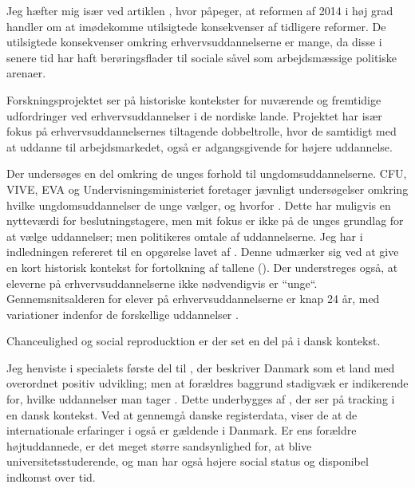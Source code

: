 Jeg hæfter mig især ved artiklen , hvor \citeauthor{jorgensenReformenAfErhvervsuddannelserne2016} påpeger, at reformen af 2014 i høj grad handler om at imødekomme utilsigtede konsekvenser af tidligere reformer.
De utilsigtede konsekvenser omkring erhvervsuddannelserne er mange, da disse i senere tid har haft berøringsflader til sociale såvel som arbejdsmæssige politiske arenaer.

Forskningsprojektet  ser på historiske kontekster for nuværende og fremtidige udfordringer ved erhvervsuddannelser i de nordiske lande.
Projektet har især fokus på erhvervsuddannelsernes tiltagende dobbeltrolle, hvor de samtidigt med at uddanne til arbejdsmarkedet, også er adgangsgivende for højere uddannelse.

Der undersøges en del omkring de unges forhold til ungdomsuddannelserne.
CFU, VIVE, EVA og Undervisningsministeriet foretager jævnligt undersøgelser omkring hvilke ungdomsuddannelser de unge vælger, og hvorfor \autocite[se fx.][]{undervisningsministerietOg10Klasseelevernes2017, borne-ogundervisningsministerietHvemOgHvor, danmarksstatistikErhvervsuddannelserDanmark20192019}.
Dette har muligvis en nytteværdi for beslutningstagere, men mit fokus er ikke på de unges grundlag for at vælge uddannelser; men politikeres omtale af uddannelserne.
Jeg har i indledningen refereret til en opgørelse lavet af \citeauthor{danmarksstatistikErhvervsuddannelserDanmark20192019}.
Denne udmærker sig ved at give en kort historisk kontekst for fortolkning af tallene (\citeyear[s. 8ff]{danmarksstatistikErhvervsuddannelserDanmark20192019}).
Der understreges også, at eleverne på erhvervsuddannelserne ikke nødvendigvis er “unge“.
Gennemsnitsalderen for elever på erhvervsuddannelserne er knap 24 år, med variationer indenfor de forskellige uddannelser \autocite[s. 14]{danmarksstatistikErhvervsuddannelserDanmark20192019}.

Chanceulighed og social reproducktion er der set en del på i dansk kontekst.

Jeg henviste i specialets første del til \citeauthor{munkSocialUlighedOg2014}, der beskriver Danmark som et land med overordnet positiv udvikling; men at forældres baggrund stadigvæk er indikerende for, hvilke uddannelser man tager \autocite{munkSocialUlighedOg2014}.
Dette underbygges af \citeauthor{felsbirkelundStructureCausesConsequences2019}, der ser på tracking i en dansk kontekst.
Ved at gennemgå danske registerdata, viser de at de internationale erfaringer i også er gældende i Danmark.
Er ens forældre højtuddannede, er det meget større sandsynlighed for, at blive universitetsstuderende, og man har også højere social status og disponibel indkomst over tid.

